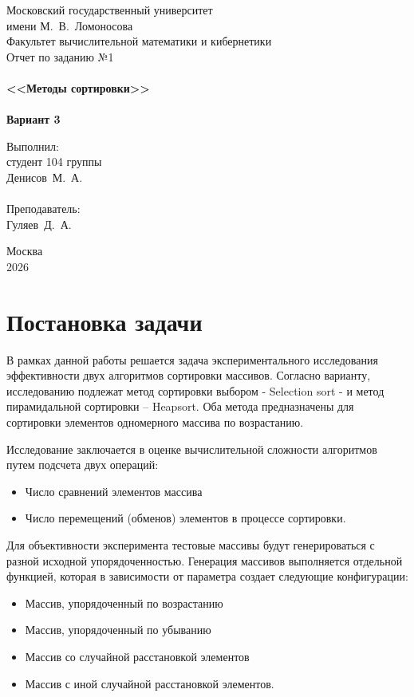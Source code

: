 \documentclass[a4paper,12pt,titlepage,finall]{article}
\begin{document}
\begin{titlepage}
    \begin{center}
	{\small \sc Московский государственный университет \\имени М.~В.~Ломоносова\\
	Факультет вычислительной математики и кибернетики\\}
	\vfill
	{\Large \sc Отчет по заданию №1}\\
	~\\
	{\large \bf <<Методы сортировки>>}\\ 
	~\\
	{\large \bf Вариант 3}
    \end{center}
    \begin{flushright}
	\vfill {Выполнил:\\
	студент 104 группы\\
	Денисов~М.~А.\\
	~\\
	Преподаватель:\\
	Гуляев~Д.~А.}
    \end{flushright}
    \begin{center}
	\vfill
	{\small Москва\\2026}
    \end{center}
\end{titlepage}

\tableofcontents
\newpage

\section{Постановка задачи}

В рамках данной работы решается задача экспериментального исследования эффективности двух алгоритмов сортировки массивов. Согласно варианту, исследованию подлежат метод сортировки выбором - Selection sort - и метод пирамидальной сортировки – Heapsort. Оба метода предназначены для сортировки элементов одномерного массива по возрастанию.

Исследование заключается в оценке вычислительной сложности алгоритмов путем подсчета двух операций:
\begin{itemize}
\item Число сравнений элементов массива
\item Число перемещений (обменов) элементов в процессе сортировки.
\end{itemize}
Для объективности эксперимента тестовые массивы будут генерироваться с разной исходной упорядоченностью. Генерация массивов выполняется отдельной функцией, которая в зависимости от параметра создает следующие конфигурации:
\begin{itemize}
\item Массив, упорядоченный по возрастанию
\item Массив, упорядоченный по убыванию
\item Массив со случайной расстановкой элементов
\item Массив с иной случайной расстановкой элементов. 
\end{itemize}
\end{document}
